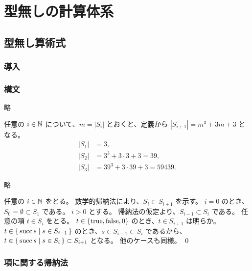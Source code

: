 \part{型無しの計算体系}
\chapter{型無し算術式}
\section{導入}

\section{構文}

\begin{jexercise*}[3.2.4]
  略
\end{jexercise*}
\begin{jproof}
  任意の $i \in \mathbb{N}$ について、$m = |S_i|$ とおくと、定義から $|S_{i+1}| = m^3 + 3m + 3$ となる。
  \begin{align*}
    |S_1| & = 3,
    \\ |S_2| & = 3^3 + 3 \cdot 3 + 3 = 39,
    \\ |S_3| & = 39^3 + 3 \cdot 39 + 3 = 59439.
  \end{align*}
\end{jproof}

\begin{jexercise*}[3.2.5.]
  略
\end{jexercise*}
\begin{jproof}
  任意の $i \in \mathbb{N}$ をとる。
  数学的帰納法により、$S_i \subset S_{i+1}$ を示す。
  $i = 0$ のとき、$S_0 = \emptyset \subset S_1$ である。
  $i > 0$ とする。
  帰納法の仮定より、$S_{i-1} \subset S_i$ である。
  任意の項 $t \in S_i$ をとる。
  $t \in \{\operatorname{true}, \operatorname{false}, 0\}$ のとき、$t \in S_{i+1}$ は明らか。
  $t \in \{\,\operatorname{succ} s \mid s \in S_{i-1}\,\}$ のとき、$s \in S_{i-1} \subset S_i$ であるから、$t \in \{\,\operatorname{succ} s \mid s \in S_i\,\} \subset S_{i+1}$ となる。
  他のケースも同様。
  \qed
\end{jproof}

\section{項に関する帰納法}


